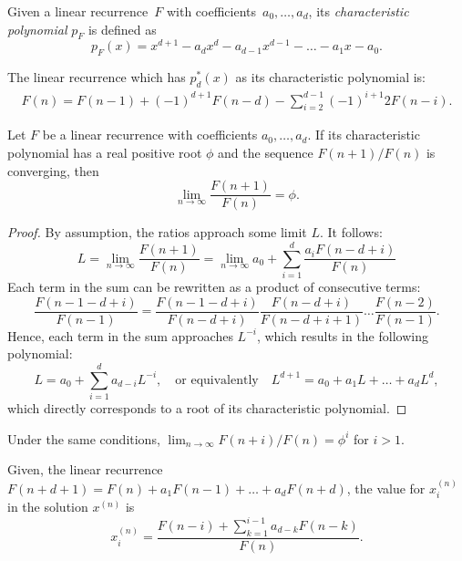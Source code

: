 \documentclass[english,version-2020-11]{uzl-thesis}
\begin{document}
\begin{definition}
  Given a linear recurrence~$F$ with coefficients~$a_0, \dots, a_d$, its
  \emph{characteristic polynomial} $p_F$ is defined as
  \[
    p_F(x) = x^{d+1} - a_d x^d - a_{d-1} x^{d-1} - \dots - a_1 x - a_0.
  \]
\end{definition}

\begin{example}
  The linear recurrence which has $p_d^*(x)$ as its characteristic polynomial is:
  \begin{align*}
    F(n) = F(n - 1) + (-1)^{d+1} F(n - d) - \sum_{i=2}^{d - 1} (-1)^{i+1} 2 F(n - i).
  \end{align*}
\end{example}

\begin{lemma}
  Let $F$ be a linear recurrence with coefficients $a_0, \dots, a_d$.
  If its characteristic polynomial has a real positive root $\phi$
  and the sequence $F(n+1)/F(n)$ is converging, then
  \[
    \lim_{n \to \infty} \frac{F(n + 1)}{F(n)} = \phi.
  \]
\end{lemma}

\begin{proof}
  By assumption, the ratios approach some limit $L$. It follows:
  \[
    L
    = \lim_{n \to \infty} \frac{F(n + 1)}{F(n)}
    = \lim_{n \to \infty} a_0 + \sum_{i = 1}^d \frac{a_i F(n - d + i)}{F(n)}
  \]
  Each term in the sum can be rewritten as a product of consecutive terms:
  \[
    \frac{F(n - 1 - d + i)}{F(n - 1)}
    = \frac{F(n - 1 - d + i)}{F(n - d + i)} \frac{F(n - d + i)}{F(n - d + i + 1)} \dots \frac{F(n - 2)}{F(n-1)}.
  \]
  Hence, each term in the sum approaches $L^{-i}$,
  which results in the following polynomial:
  \[
    L = a_0 + \sum_{i = 1}^d a_{d - i} L^{-i},
    \quad \text{or equivalently} \quad
    L^{d+1} = a_0 + a_1 L + \dots + a_d L^d,
  \]
  which directly corresponds to a root of its characteristic polynomial.
\end{proof}

\begin{corollary}
  Under the same conditions, $\lim_{n \to \infty} F(n + i) / F(n) = \phi^i$ for $i > 1$.
\end{corollary}

Given, the linear recurrence $F(n + d + 1) = F(n) + a_1 F(n - 1) + \dots + a_d F(n + d)$,
the value for $x_i^{(n)}$ in the solution $x^{(n)}$ is
\begin{equation}
  \label{eq:general-solution}
  x_i^{(n)} = \frac{F(n - i) + \sum_{k=1}^{i-1} a_{d-k} F(n - k)}{F(n)}.
\end{equation}
\end{document}
